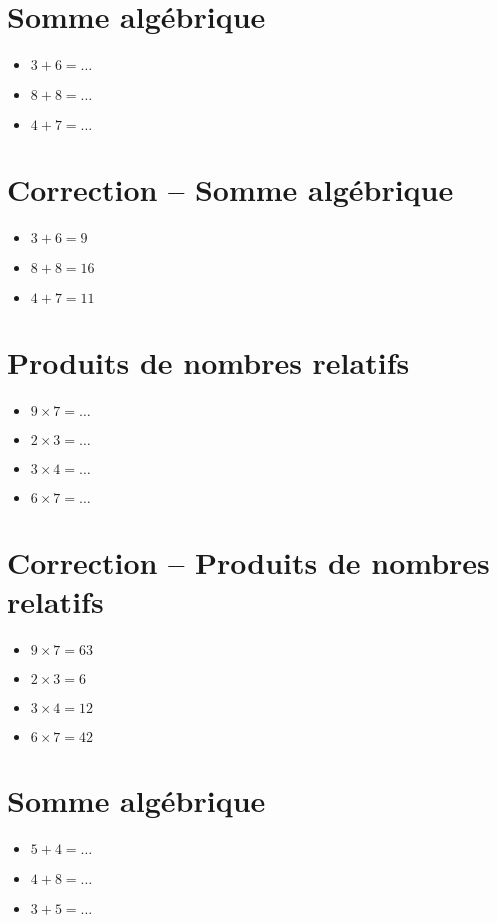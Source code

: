 \documentclass[a4paper,11pt,fleqn]{article}
\begin{document}
\pagestyle{empty}


\section{Somme algébrique}
\begin{itemize}

3
3
3
3
3
3
3
3
3
3
  \item $3+6=\ldots$
  \item $8+8=\ldots$
  \item $4+7=\ldots$
\end{itemize}

\section{Correction -- Somme algébrique}
\begin{itemize}

  \item $3+6=9$
  \item $8+8=16$
  \item $4+7=11$
\end{itemize}

\section{Produits de nombres relatifs}
\begin{itemize}

  \item $9\times7=\ldots$
  \item $2\times3=\ldots$
  \item $3\times4=\ldots$
  \item $6\times7=\ldots$
\end{itemize}

\section{Correction -- Produits de nombres relatifs}
\begin{itemize}

  \item $9\times7=63$
  \item $2\times3=6$
  \item $3\times4=12$
  \item $6\times7=42$
\end{itemize}
\newpage
\setcounter{exo}{0}
\setcounter{section}{0}
\section{Somme algébrique}
\begin{itemize}

3
3
3
3
3
3
3
3
3
3
  \item $5+4=\ldots$
  \item $4+8=\ldots$
  \item $3+5=\ldots$
\end{itemize}
\end{document}
